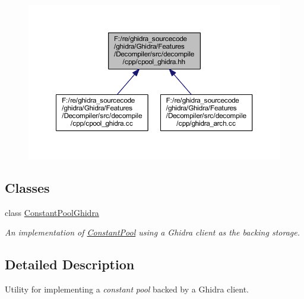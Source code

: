 \begin{figure}[H]
\begin{center}
\leavevmode
\includegraphics[width=350pt]{cpool__ghidra_8hh__dep__incl}
\end{center}
\end{figure}
\subsection*{Classes}
\begin{DoxyCompactItemize}
\item 
class \mbox{\hyperlink{class_constant_pool_ghidra}{Constant\+Pool\+Ghidra}}
\begin{DoxyCompactList}\small\item\em An implementation of \mbox{\hyperlink{class_constant_pool}{Constant\+Pool}} using a Ghidra client as the backing storage. \end{DoxyCompactList}\end{DoxyCompactItemize}


\subsection{Detailed Description}
Utility for implementing a {\itshape constant} {\itshape pool} backed by a Ghidra client. 

